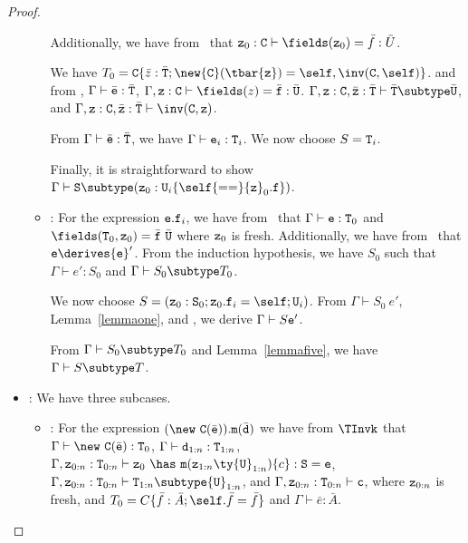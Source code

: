 \begin{proof}
\begin{itemize}
\begin{itemize}
             Additionally, we have from \RField\ that
             ${\tt z}_0: {\tt C} \vdash \fields({\tt z}_0)=\bar{f}: \bar{U}$.

             We have 
             $T_0 = {\tt C}\{\bar{z}: \bar{\tt T}{\tt ; \new {\tt C}(\tbar{z}) = \self, \inv({\tt C},\self)}\}$.
             and from \TNew, 
             $\Gamma \vdash \bar{\tt e}: \bar{\tt T}$,
             $\Gamma,{\tt z}:{\tt C} \vdash
                \fields(z)=\bar{\tt f}: \bar{\tt U}$.
             $\Gamma, {\tt z}: {\tt C}, \bar{\tt z}: \bar{\tt T} \vdash 
                   \bar{\tt T} \subtype \bar{\tt U}$, and
             $\Gamma, {\tt z}: {\tt C}, \bar{\tt z}: \bar{\tt T} \vdash 
                   \inv({\tt C},{\tt z})$.

             From $\Gamma \vdash \bar{\tt e}: \bar{\tt T}$, we have
             $\Gamma \vdash {\tt e}_i: {\tt T}_i$.
             We now choose $S = {\tt T}_i$.

             Finally, it is straightforward to show
             $\Gamma \vdash {\tt S} \subtype
                ({\tt z}_0: {\tt U}_i\{\self{\tt ==}{\tt z}_0.{\tt f}\})$.
   \item
   \RCField: For the expression ${\tt e.f}_i$, we have from \TField\ that
             $\Gamma \vdash {\tt e}: {\tt T}_0$ and
             $\fields({\tt T}_0,{\tt z}_0)= \bar{\tt f}\ \bar{\tt U}$
             where ${\tt z}_0$ is fresh.
             Additionally, we have from \RCField\ that  
             ${\tt e} \derives {{\tt e}}'$.
             From the induction hypothesis, we have $S_0$ such that 
             $\Gamma \vdash e': S_0$ and $\Gamma \vdash S_0 \subtype T_0$.

             We now choose 
             $S = 
               ({\tt z}_0: {\tt S}_0; {\tt z}_0.{\tt f}_i=\self;{\tt U}_i)$.
             From $\Gamma \vdash S_0\ e'$, Lemma~\ref{lemmaone}, and
             \TField, we derive
             $\Gamma \vdash S {{\tt e}}'$.

             From $\Gamma \vdash S_0 \subtype T_0$ and 
             Lemma~\ref{lemmafive}, we have $\Gamma \vdash S \subtype T$.
   \end{itemize}
\item
\TInvk: We have three subcases.
   \begin{itemize}
   \item
   \RInvk:  For the expression 
            $(\new\ {\tt C}(\bar{\tt e})).{\tt m}(\bar{\tt d})$
            we have from $\TInvk$ that
            $\Gamma \vdash \new\ {\tt C}(\bar{\tt e}): {\tt T}_0$,
            $\Gamma \vdash {\tt d}_{1:n}: {\tt T}_{1:n}$,
            $\Gamma, {\tt z}_{0:n}: {\tt T}_{0:n} \vdash
                {\tt z}_0\ \has\ {\tt m}({\tt z}_{1:n} \ty {\tt U}_{1:n})\{c\}: {\tt S} = {\tt e}$,
            $\Gamma, {\tt z}_{0:n}: {\tt T}_{0:n} \vdash
                {\tt T}_{1:n} \subtype {\tt U}_{1:n}$,
            and
            $\Gamma, {\tt z}_{0:n}: {\tt T}_{0:n} \vdash {\tt c}$,
            where ${\tt z}_{0:n}$ is fresh, and
            $T_0 = C\{\bar{f}: \bar{A}; \self.\bar{f} = \bar{f}\}$ and
            $\Gamma \vdash \bar{e}: \bar{A}$.


\end{itemize}
\end{itemize}
\end{proof}
